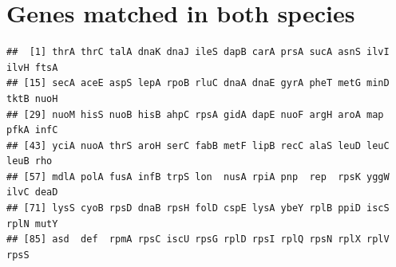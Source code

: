 \documentclass[10pt]{article}\usepackage[]{graphicx}\usepackage[]{color}
\makeatletter
\newenvironment{kframe}{%
 \def\at@end@of@kframe{}%
 \ifinner\ifhmode%
  \def\at@end@of@kframe{\end{minipage}}%
  \begin{minipage}{\columnwidth}%
 \fi\fi%
 \def\FrameCommand##1{\hskip\@totalleftmargin \hskip-\fboxsep
 \colorbox{shadecolor}{##1}\hskip-\fboxsep
     \hskip-\linewidth \hskip-\@totalleftmargin \hskip\columnwidth}%
 \MakeFramed {\advance\hsize-\width
   \@totalleftmargin\z@ \linewidth\hsize
   \@setminipage}}%
 {\par\unskip\endMakeFramed%
 \at@end@of@kframe}
\newenvironment{knitrout}{}{} %
\theoremstyle{plain}
\theoremstyle{definition}
\makeatother
\begin{document}
\section{Genes matched in both species}
\begin{knitrout}
\color{fgcolor}\begin{kframe}
\begin{verbatim}
##  [1] thrA thrC talA dnaK dnaJ ileS dapB carA prsA sucA asnS ilvI ilvH ftsA
## [15] secA aceE aspS lepA rpoB rluC dnaA dnaE gyrA pheT metG minD tktB nuoH
## [29] nuoM hisS nuoB hisB ahpC rpsA gidA dapE nuoF argH aroA map  pfkA infC
## [43] yciA nuoA thrS aroH serC fabB metF lipB recC alaS leuD leuC leuB rho 
## [57] mdlA polA fusA infB trpS lon  nusA rpiA pnp  rep  rpsK yggW ilvC deaD
## [71] lysS cyoB rpsD dnaB rpsH folD cspE lysA ybeY rplB ppiD iscS rplN mutY
## [85] asd  def  rpmA rpsC iscU rpsG rplD rpsI rplQ rpsN rplX rplV rpsS
\end{verbatim}
\end{kframe}
\end{knitrout}
\end{document}
